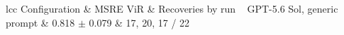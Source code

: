 \begin{table}[H]
\centering
\caption{MSRE visual-information recovery over three runs. Values are mean $\pm$ standard deviation.}
\label{tab:autosam_msre_vision}
\begin{tabular}{lcc}
\hline
Configuration & MSRE ViR & Recoveries by run \
\hline
GPT-5.6 Sol, generic prompt & 0.818 $\pm$ 0.079 & 17, 20, 17 / 22 \
\hline
\end{tabular}
\end{table}
